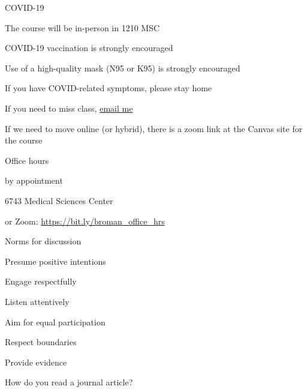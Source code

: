 \documentclass[aspectratio=169,12pt,t]{beamer}
\begin{document}
\begin{frame}{COVID-19}

  \bbi
\item The course will be in-person in 1210 MSC
\item COVID-19 vaccination is strongly encouraged
\item Use of a high-quality mask (N95 or K95) is strongly encouraged
\item If you have COVID-related symptoms, please stay home
\item If you need to miss class, \href{mailto:broman@wisc.edu}{email me}
\item If we need to move online (or hybrid), there is a zoom link at
  the Canvas site for the course
  \ei

\end{frame}




\begin{frame}{Office hours}

  \bbi
\item {\hilit by appointment}
\item 6743 Medical Sciences Center
\item or Zoom: \url{https://bit.ly/broman_office_hrs}
\ei

\end{frame}






\begin{frame}{Norms for discussion}

      \bbi
    \item Presume positive intentions
    \item Engage respectfully
    \item Listen attentively
    \item Aim for equal participation
    \item Respect boundaries
    \item Provide evidence
      \ei

\end{frame}




\begin{frame}[c]{}

\centerline{\Large \color{title} How do you read a journal article?}

\end{frame}
\end{document}
